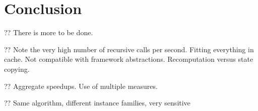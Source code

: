 \documentclass[sigconf]{acmart}
\begin{document}
%
%
%
%

\section{Conclusion}

?? There is more to be done.

?? Note the very high number of recursive calls per second. Fitting everything in cache. Not
compatible with framework abstractions. Recomputation versus state copying.

?? Aggregate speedups. Use of multiple measures.

?? Same algorithm, different instance families, very sensitive



\end{document}
